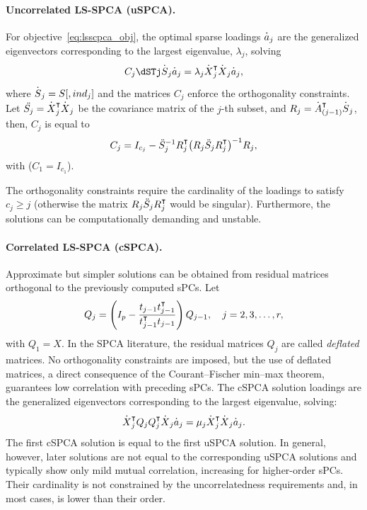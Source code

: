 \documentclass[article]{jss}
\begin{document}
\paragraph{Uncorrelated LS-SPCA (uSPCA).}
For objective~\ref{eq:lsscpca_obj}, the optimal sparse loadings ${\overset{\boldsymbol{.}}{a}_j}$ are the generalized eigenvectors corresponding to the largest eigenvalue, $\lambda_j$, solving
\begin{equation}\label{eq:uspca_sol}
C_j \dSTj \dSj \daj = \lambda_j \dXjT \dXj \daj,
\end{equation}
where ${\overset{\boldsymbol{.}}{S}_j} = S[, ind_j]$ and the matrices $C_j$ enforce the orthogonality constraints. 
Let $\ddot{S_j} =\dXjT\dXj$ be the covariance matrix of the $j$-th subset, and $R_j = \dA\traspdr{j -1} \dSj$,  then, $C_j$ is equal to
\[
C_j = I_{c_j} - \ddot{S}\matinvj{j} R\trasps{j}
\big(R_j\ddot{S}_j R\trasps{j}\big)^{-1} R_j,
\]
with ($C_1 = I_{c_1}$).

The orthogonality constraints require the cardinality of the loadings to satisfy $c_j \geq j$ (otherwise the matrix $R_j\ddot{S}_j R\trasps{j}$ would be singular). Furthermore, the solutions can be computationally demanding and unstable.

\paragraph{Correlated LS-SPCA (cSPCA).}
Approximate but simpler solutions can be obtained from residual matrices orthogonal to the previously computed sPCs. Let
\begin{equation}\label{eq:defX_def}
Q_j = \left(I_p - \frac{t_{j-1} t\trasps{j-1}}{t\trasps{j-1} t_{j-1}}\right) Q_{j-1},
\quad j = 2, 3, \ldots, r,
\end{equation}
with $Q_1 = X$. In the SPCA literature, the residual matrices $Q_j$ are called \emph{deflated} matrices. No orthogonality constraints are imposed, but the use of deflated matrices, a direct consequence of the Courant--Fischer min--max theorem, guarantees low correlation with preceding sPCs. The cSPCA solution loadings are the generalized eigenvectors corresponding to the largest eigenvalue, solving:
\begin{equation}\label{eq:uspca_sol}
\dXjT Q_j\QjT\dXj \daj = \mu_j \dXjT\dXj \daj.
\end{equation}
The first cSPCA solution is equal to the first uSPCA solution. In general, however, later solutions are not equal to the corresponding uSPCA solutions and typically show only mild mutual correlation, increasing for higher-order sPCs. Their cardinality is not constrained by the uncorrelatedness requirements and, in most cases, is lower than their order.
\end{document}
